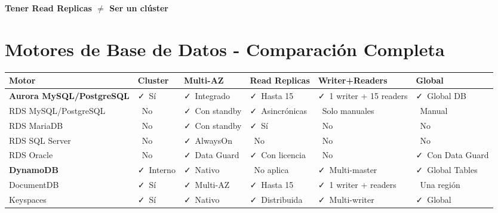 \documentclass[12pt,a4paper]{report}
\newcommand{\important}[1]{\textcolor{dangerred}{\textbf{#1}}}
\newcommand{\vcheckmark}{\textcolor{successgreen}{\faCheck}}
\newcommand{\crossmark}{\textcolor{dangerred}{\faTimes}}
\begin{document}
\begin{warningbox}[Importante]
\important{Tener Read Replicas $\neq$ Ser un clúster}
\end{warningbox}

\section{Motores de Base de Datos - Comparación Completa}

\begin{center}
\begin{longtable}{|p{2.5cm}|p{1.5cm}|p{2cm}|p{2cm}|p{2.5cm}|p{2cm}|}
\hline
\cellcolor{awsblue!20}\textbf{Motor} & \cellcolor{awsblue!20}\textbf{Cluster} & \cellcolor{awsblue!20}\textbf{Multi-AZ} & \cellcolor{awsblue!20}\textbf{Read Replicas} & \cellcolor{awsblue!20}\textbf{Writer+Readers} & \cellcolor{awsblue!20}\textbf{Global} \\
\hline
\cellcolor{successgreen!20}\textbf{Aurora MySQL/PostgreSQL} & \vcheckmark\ Sí & \vcheckmark\ Integrado & \vcheckmark\ Hasta 15 & \vcheckmark\ 1 writer + 15 readers & \vcheckmark\ Global DB \\
\hline
RDS MySQL/PostgreSQL & \crossmark\ No & \vcheckmark\ Con standby & \vcheckmark\ Asincrónicas & \crossmark\ Solo manuales & \crossmark\ Manual \\
\hline
RDS MariaDB & \crossmark\ No & \vcheckmark\ Con standby & \vcheckmark\ Sí & \crossmark\ No & \crossmark\ No \\
\hline
RDS SQL Server & \crossmark\ No & \vcheckmark\ AlwaysOn & \crossmark\ No & \crossmark\ No & \crossmark\ No \\
\hline
RDS Oracle & \crossmark\ No & \vcheckmark\ Data Guard & \vcheckmark\ Con licencia & \crossmark\ No & \vcheckmark\ Con Data Guard \\
\hline
\cellcolor{successgreen!20}\textbf{DynamoDB} & \vcheckmark\ Interno & \vcheckmark\ Nativo & \crossmark\ No aplica & \vcheckmark\ Multi-master & \vcheckmark\ Global Tables \\
\hline
DocumentDB & \vcheckmark\ Sí & \vcheckmark\ Multi-AZ & \vcheckmark\ Hasta 15 & \vcheckmark\ 1 writer + readers & \crossmark\ Una región \\
\hline
Keyspaces & \vcheckmark\ Sí & \vcheckmark\ Nativo & \vcheckmark\ Distribuida & \vcheckmark\ Multi-writer & \vcheckmark\ Global \\
\hline
\end{longtable}
\end{center}
\end{document}

